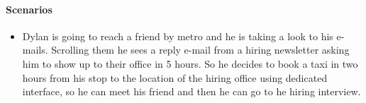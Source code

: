\paragraph{Scenarios}
\begin{itemize}
	\item Dylan is going to reach a friend by metro and he is taking a look to his e-mails. Scrolling them he sees a reply e-mail from a hiring newsletter asking him to show up to their office in 5 hours.
	So he decides to book a taxi in two hours from his stop to the location of the hiring office using \myTaxiService{} dedicated interface, so he can meet his friend and then he can go to he hiring interview.
\end{itemize}
